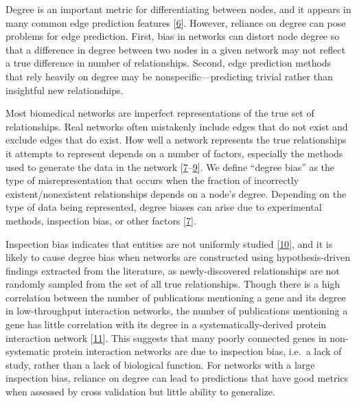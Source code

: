 Degree is an important metric for differentiating between nodes, and it appears in many common edge prediction features {[}\protect\hyperlink{ref-ohIv6zMA}{6}{]}.
However, reliance on degree can pose problems for edge prediction.
First, bias in networks can distort node degree so that a difference in degree between two nodes in a given network may not reflect a true difference in number of relationships.
Second, edge prediction methods that rely heavily on degree may be nonspecific---predicting trivial rather than insightful new relationships.

Most biomedical networks are imperfect representations of the true set of relationships.
Real networks often mistakenly include edges that do not exist and exclude edges that do exist.
How well a network represents the true relationships it attempts to represent depends on a number of factors, especially the methods used to generate the data in the network {[}\protect\hyperlink{ref-bo2VEmIz}{7}--\protect\hyperlink{ref-C4FHCVCz}{9}{]}.
We define ``degree bias'' as the type of misrepresentation that occurs when the fraction of incorrectly existent/nonexistent relationships depends on a node's degree.
Depending on the type of data being represented, degree biases can arise due to experimental methods, inspection bias, or other factors {[}\protect\hyperlink{ref-bo2VEmIz}{7}{]}.

Inspection bias indicates that entities are not uniformly studied {[}\protect\hyperlink{ref-lnDqu0oW}{10}{]}, and it is likely to cause degree bias when networks are constructed using hypothesis-driven findings extracted from the literature, as newly-discovered relationships are not randomly sampled from the set of all true relationships.
Though there is a high correlation between the number of publications mentioning a gene and its degree in low-throughput interaction networks, the number of publications mentioning a gene has little correlation with its degree in a systematically-derived protein interaction network {[}\protect\hyperlink{ref-LCyCrr7W}{11}{]}.
This suggests that many poorly connected genes in non-systematic protein interaction networks are due to inspection bias, i.e.~a lack of study, rather than a lack of biological function.
For networks with a large inspection bias, reliance on degree can lead to predictions that have good metrics when assessed by cross validation but little ability to generalize.

